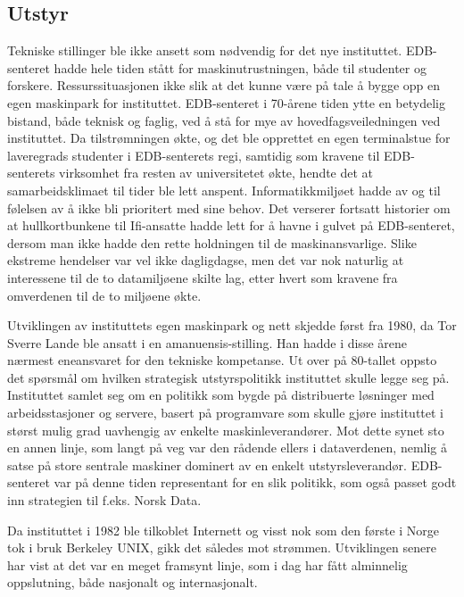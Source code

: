 \documentclass[../main.tex]{subfiles}
\begin{document}
\subsection{Utstyr}
Tekniske stillinger ble ikke ansett som nødvendig for det nye instituttet. EDB-senteret hadde hele tiden stått for maskinutrustningen, både til studenter og forskere. Ressurssituasjonen ikke slik at det kunne være på tale å bygge opp en egen maskinpark for instituttet. EDB-senteret i 70-årene tiden ytte en betydelig bistand, både teknisk og faglig, ved å stå for mye av hovedfagsveiledningen ved instituttet. Da tilstrømningen økte, og det ble opprettet en egen terminalstue for laveregrads studenter i EDB-senterets regi, samtidig som kravene til EDB-senterets virksomhet fra resten av universitetet økte, hendte det at samarbeidsklimaet til tider ble lett anspent. Informatikkmiljøet hadde av og til følelsen av å ikke bli prioritert med sine behov. Det verserer fortsatt historier om at hullkortbunkene til Ifi-ansatte hadde lett for å havne i gulvet på EDB-senteret, dersom man ikke hadde den rette holdningen til de maskinansvarlige. Slike ekstreme hendelser var vel ikke dagligdagse, men det var nok naturlig at interessene til de to datamiljøene skilte lag, etter hvert som kravene fra omverdenen til de to miljøene økte.

Utviklingen av instituttets egen maskinpark og nett skjedde først fra 1980, da Tor Sverre Lande ble ansatt i en amanuensis-stilling. Han hadde i disse årene nærmest eneansvaret for den tekniske kompetanse. Ut over på 80-tallet oppsto det spørsmål om hvilken strategisk utstyrspolitikk instituttet skulle legge seg på. Instituttet samlet seg om en politikk som bygde på distribuerte løsninger med arbeidsstasjoner og servere, basert på programvare som skulle gjøre instituttet i størst mulig grad uavhengig av enkelte maskinleverandører. Mot dette synet sto en annen linje, som langt på veg var den rådende ellers i dataverdenen, nemlig å satse på store sentrale maskiner dominert av en enkelt utstyrsleverandør. EDB-senteret var på denne tiden representant for en slik politikk, som også passet godt inn strategien til f.eks. Norsk Data.

Da instituttet i 1982 ble tilkoblet Internett og visst nok som den første i Norge tok i bruk Berkeley UNIX, gikk det således mot strømmen. Utviklingen senere har vist at det var en meget framsynt linje, som i dag har fått alminnelig oppslutning, både nasjonalt og internasjonalt.

\end{document}
